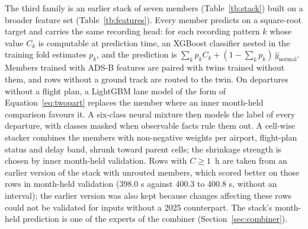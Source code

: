 \documentclass[
  manuscript=article,  %
  layout=preprint,  %
  year=20xx,
  volume=x,
]{extra/joas}
\begin{document}
The third family is an earlier stack of seven members (Table~\ref{tb:stack}) built on a broader feature set (Table~\ref{tb:features}). Every member predicts on a square-root target and carries the same recording head: for each recording pattern $k$ whose value $C_k$ is computable at prediction time, an XGBoost classifier nested in the training fold estimates $p_k$, and the prediction is $\sum_k p_k C_k + (1-\sum_k p_k)\,\hat{y}_{\mathrm{normal}}$. Members trained with ADS-B features are paired with twins trained without them, and rows without a ground track are routed to the twin. On departures without a flight plan, a LightGBM \cite{ke2017lightgbm} lane model of the form of Equation~\eqref{eq:twopart} replaces the member where an inner month-held comparison favours it. A six-class neural mixture then models the label of every departure, with classes masked when observable facts rule them out. A cell-wise stacker combines the members with non-negative weights per airport, flight-plan status and delay band, shrunk toward parent cells; the shrinkage strength is chosen by inner month-held validation. Rows with $C \geq 1$~h are taken from an earlier version of the stack with unrouted members, which scored better on those rows in month-held validation (398.0 s against 400.3 to 400.8 s, without an interval); the earlier version was also kept because changes affecting these rows could not be validated for inputs without a 2025 counterpart. The stack's month-held prediction is one of the experts of the combiner (Section~\ref{sec:combiner}).
\end{document}

